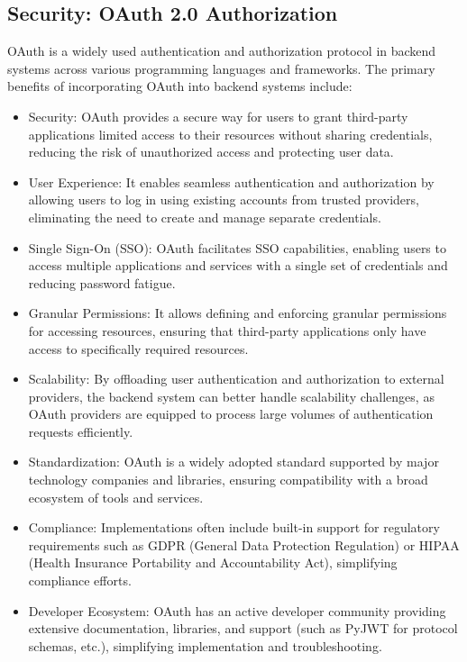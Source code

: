 \subsection{Security: OAuth 2.0 Authorization}
OAuth is a widely used authentication and authorization protocol in backend systems across various programming languages and frameworks. The primary benefits of incorporating OAuth into backend systems include:
\begin{itemize}
    \item {Security:} OAuth provides a secure way for users to grant third-party applications limited access to their resources without sharing credentials, reducing the risk of unauthorized access and protecting user data.
    \item {User Experience:} It enables seamless authentication and authorization by allowing users to log in using existing accounts from trusted providers, eliminating the need to create and manage separate credentials.
    \item {Single Sign-On (SSO):} OAuth facilitates SSO capabilities, enabling users to access multiple applications and services with a single set of credentials and reducing password fatigue.
    \item {Granular Permissions:} It allows defining and enforcing granular permissions for accessing resources, ensuring that third-party applications only have access to specifically required resources.
    \item {Scalability:} By offloading user authentication and authorization to external providers, the backend system can better handle scalability challenges, as OAuth providers are equipped to process large volumes of authentication requests efficiently.
    \item {Standardization:} OAuth is a widely adopted standard supported by major technology companies and libraries, ensuring compatibility with a broad ecosystem of tools and services.
    \item {Compliance:} Implementations often include built-in support for regulatory requirements such as GDPR (General Data Protection Regulation) or HIPAA (Health Insurance Portability and Accountability Act), simplifying compliance efforts.
    \item {Developer Ecosystem:} OAuth has an active developer community providing extensive documentation, libraries, and support (such as PyJWT for protocol schemas, etc.), simplifying implementation and troubleshooting.
\end{itemize}


